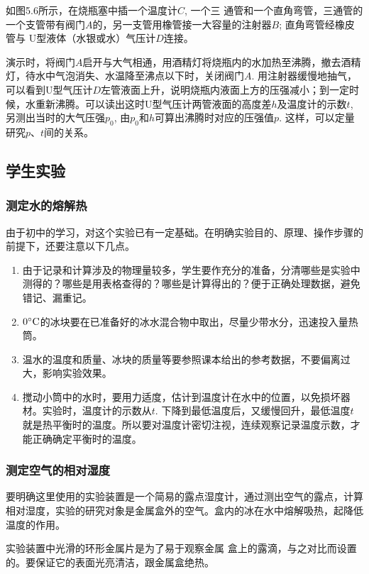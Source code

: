 如图5.6所示，在烧瓶塞中插一个温度计$C$, 一个三
通管和一个直角弯管，三通管的一个支管带有阀门$A$的，另一支管用橡管接一大容量的注射器$B$; 直角弯管经橡皮管与
U型液体（水银或水）气压计$D$连接。

演示时，将阀门$A$启开与大气相通，用酒精灯将烧瓶内的水加热至沸腾，撤去酒精灯，待水中气泡消失、水温降至沸点以下时，关闭阀门$A$. 用注射器缓慢地抽气，可以看到U型气压计$D$左管液面上升，说明烧瓶内液面上方的压强减小；到一定时候，水重新沸腾。可以读出这时U型气压计两管液面的高度差$h$及温度计的示数$t$, 另测出当时的大气压强$p_0$, 由$p_0$和$h$可算出沸腾时对应的压强值$p$. 这样，可以定量研究$p$、$t$间的关系。

\subsection{学生实验}
\subsubsection{测定水的熔解热}

由于初中的学习，对这个实验已有一定基础。在明确实验目的、原理、操作步骤的前提下，还要注意以下几点。
\begin{enumerate}
\item 由于记录和计算涉及的物理量较多，学生要作充分的准备，分清哪些是实验中测得的？哪些是用表格查得的？哪些是计算得出的？便于正确处理数据，避免错记、漏重记。
\item $0^{\circ}{\rm C}$的冰块要在已准备好的冰水混合物中取出，尽量少带水分，迅速投入量热筒。
\item 温水的温度和质量、冰块的质量等要参照课本给出的参考数据，不要偏离过大，影响实验效果。
\item 搅动小筒中的水时，要用力适度，估计到温度计在水中的位置，以免损坏器材。实验时，温度计的示数从$t$. 下降到最低温度后，又缓慢回升，最低温度$t$就是热平衡时的温度。所以要对温度计密切注视，连续观察记录温度示数，才能正确确定平衡时的温度。
\end{enumerate}

\subsubsection{测定空气的相对湿度}

要明确这里使用的实验装置是一个简易的露点湿度计，通过测出空气的露点，计算相对湿度，实验的研究对象是金属盒外的空气。盒内的冰在水中熔解吸热，起降低温度的作用。

实验装置中光滑的环形金属片是为了易于观察金属
盒上的露滴，与之对比而设置的。要保证它的表面光亮清洁，跟金属盒绝热。

